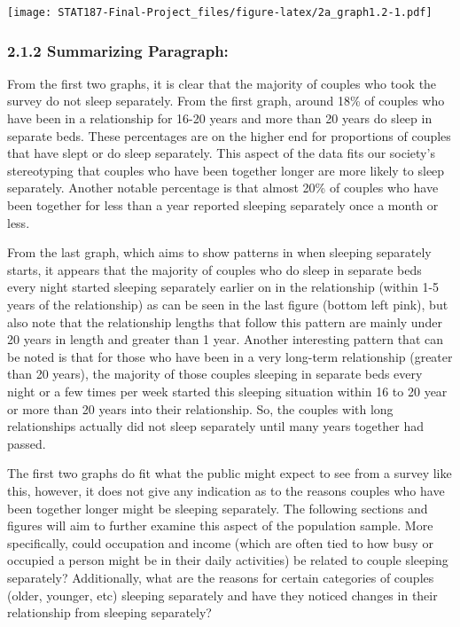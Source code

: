 \documentclass[
]{article}
\begin{document}
\texttt{[image: STAT187-Final-Project\_files/figure-latex/2a\_graph1.2-1.pdf]}

\hypertarget{summarizing-paragraph}{%
\subsubsection{2.1.2 Summarizing
Paragraph:}\label{summarizing-paragraph}}

From the first two graphs, it is clear that the majority of couples who
took the survey do not sleep separately. From the first graph, around
18\% of couples who have been in a relationship for 16-20 years and more
than 20 years do sleep in separate beds. These percentages are on the
higher end for proportions of couples that have slept or do sleep
separately. This aspect of the data fits our society's stereotyping that
couples who have been together longer are more likely to sleep
separately. Another notable percentage is that almost 20\% of couples
who have been together for less than a year reported sleeping separately
once a month or less.

From the last graph, which aims to show patterns in when sleeping
separately starts, it appears that the majority of couples who do sleep
in separate beds every night started sleeping separately earlier on in
the relationship (within 1-5 years of the relationship) as can be seen
in the last figure (bottom left pink), but also note that the
relationship lengths that follow this pattern are mainly under 20 years
in length and greater than 1 year. Another interesting pattern that can
be noted is that for those who have been in a very long-term
relationship (greater than 20 years), the majority of those couples
sleeping in separate beds every night or a few times per week started
this sleeping situation within 16 to 20 year or more than 20 years into
their relationship. So, the couples with long relationships actually did
not sleep separately until many years together had passed.

The first two graphs do fit what the public might expect to see from a
survey like this, however, it does not give any indication as to the
reasons couples who have been together longer might be sleeping
separately. The following sections and figures will aim to further
examine this aspect of the population sample. More specifically, could
occupation and income (which are often tied to how busy or occupied a
person might be in their daily activities) be related to couple sleeping
separately? Additionally, what are the reasons for certain categories of
couples (older, younger, etc) sleeping separately and have they noticed
changes in their relationship from sleeping separately?
\end{document}
